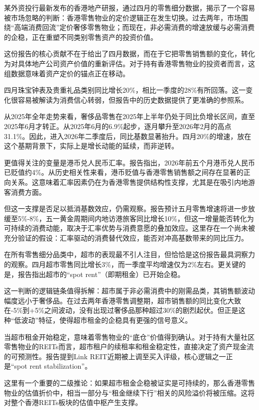 \documentclass[11pt]{ctexart}
\begin{document}
某外资投行最新发布的香港地产研报，通过四月的零售细分数据，揭示了一个容易被市场忽略的判断：香港零售物业的定价逻辑正在发生切换。过去两年，市场围绕“高端消费回流”定价奢侈零售物业；而现在，非必需消费的增速放缓与必需消费的企稳，正在重塑不同类别零售资产的投资价值。

这份报告的核心贡献不在于给出了四月数据，而在于它把零售销售额的变化，转化为对具体地产公司资产价值的重新评估。对于持有香港零售物业的投资者而言，这组数据意味着资产定价的锚点正在移动。

四月珠宝钟表及贵重礼品类别同比增长20\%，相比一季度的28\%有所回落。这一变化很容易被解读为消费信心转弱，但报告中的历史数据提供了更准确的参照系。

从2025年全年走势来看，奢侈品零售在2025年上半年仍处于同比负增长区间，直至2025年6月才转正。从2025年6月的6.9\%起步，逐月攀升至2026年2月的高点31.1\%。因此，进入2026年二季度后，同比基数显著抬升。四月20\%的增速，放在这个基期背景下，实际上是增长动能的延续，而非逆转。

更值得关注的变量是港币兑人民币汇率。报告指出，2026年前五个月港币兑人民币已贬值约4\%。从历史相关性来看，港币贬值与香港零售销售额之间存在显著的正向关系。这意味着汇率因素仍在为香港零售提供结构性支撑，尤其是在吸引内地游客消费方面。

但这一支撑是否足以抵消基数效应，仍需观察。报告预计五月零售增速将进一步放缓至5\%-8\%，五一黄金周期间内地访港旅客同比增长10\%，但这一增量能否转化为可持续的消费动能，取决于汇率优势与消费意愿的叠加效应。这里存在一个尚未被充分验证的假设：汇率驱动的消费替代效应，能否对冲高基数带来的同比压力。

在所有零售细分品类中，超市的表现最不引人注目，但恰恰是这份报告最具洞察力的观察。四月超市零售同比增长3\%，而一季度平均增速仅为2\%左右。更关键的是，报告指出超市的“spot rent”（即期租金）已开始企稳。

这一判断的逻辑链条值得拆解：超市属于非必需消费中的刚需品类，其销售额波动幅度远小于奢侈品。在过去两年香港零售调整期，超市销售额的同比变化大致在-5\%到+5\%之间波动，没有出现过奢侈品那种超过30\%的剧烈起伏。但正是这种“低波动”特征，使得超市租金的企稳具有更强的信号意义。

当超市租金开始稳定，意味着零售物业的“底仓”价值得到确认。对于持有大量社区零售物业的REITs而言，超市租户的续租率和租金稳定性，直接决定了资产现金流的可预测性。报告提到Link REIT近期被上调至买入评级，核心逻辑之一正是“spot rent stabilization”。

这里有一个重要的二级推论：如果超市租金企稳被证实是可持续的，那么香港零售物业的估值折价中，相当一部分与“租金继续下行”相关的风险溢价将被压缩。这将对整个香港REITs板块的估值中枢产生支撑。
\end{document}
